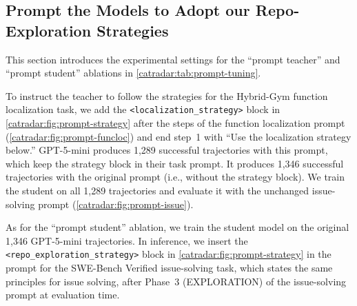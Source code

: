 \subsection{Prompt the Models to Adopt our Repo-Exploration Strategies}
This section introduces the experimental settings for the ``prompt teacher'' and ``prompt student'' ablations in \autoref{catradar:tab:prompt-tuning}.

To instruct the teacher to follow the strategies for the Hybrid-Gym function localization task, we add the \texttt{<localization\_strategy>} block in \autoref{catradar:fig:prompt-strategy} after the steps of the function localization prompt (\autoref{catradar:fig:prompt-funcloc}) and end step~1 with ``Use the localization strategy below.''
GPT-5-mini produces 1,289 successful trajectories with this prompt, which keep the strategy block in their task prompt.
It produces 1,346 successful trajectories with the original prompt (i.e., without the strategy block).
We train the student on all 1,289 trajectories and evaluate it with the unchanged issue-solving prompt (\autoref{catradar:fig:prompt-issue}).

As for the ``prompt student'' ablation, we train the student model on the original 1,346 GPT-5-mini trajectories.
In inference, we insert the \texttt{<repo\_exploration\_strategy>} block in \autoref{catradar:fig:prompt-strategy} in the prompt for the SWE-Bench Verified issue-solving task, which states the same principles for issue solving, after Phase~3 (EXPLORATION) of the issue-solving prompt at evaluation time.

